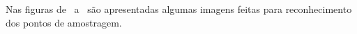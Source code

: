 \begin{SingleSpace}
Nas figuras de \primeirafoto \ a \ultimafoto \ são apresentadas algumas imagens feitas para reconhecimento dos pontos de amostragem. \\

\end{SingleSpace}


